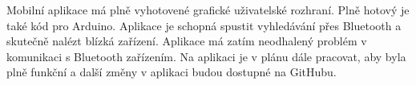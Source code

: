 \hspace{1 cm}
Mobilní aplikace má plně vyhotovené grafické uživatelské rozhraní. Plně hotový je také kód pro Arduino. Aplikace je schopná spustit vyhledávání přes Bluetooth a skutečně nalézt blízká zařízení. Aplikace má zatím neodhalený problém v komunikaci s Bluetooth zařízením. Na aplikaci je v plánu dále pracovat, aby byla plně funkční a další změny v aplikaci budou dostupné na GitHubu.

